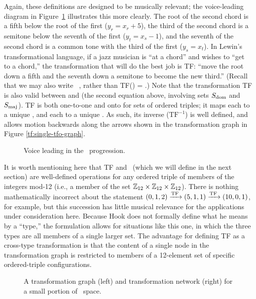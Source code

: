 \noindent Again, these definitions are designed to be musically relevant; the
voice-leading diagram in Figure~\ref{tf:tfo-voice-leading} illustrates this
more clearly. The root of the second chord is a fifth below the root
of the first ($y_r = x_r + 5$), the third of the second chord is a semitone
below the seventh of the first ($y_t = x_s - 1$), and the seventh of the
second chord is a common tone with the third of the first ($y_s = x_t$). In
Lewin's transformational language, if a jazz musician is ``at a \ii
chord'' and wishes to ``get to a \V chord,'' the transformation that
will do the best job is TF: ``move the root down a fifth and the seventh down
a semitone to become the new third.'' (Recall that we may also write
\mbox{\ii \TFarrow\ \V}, rather than TF(\ii) = \V.) Note
that the transformation TF is also valid between \V and \I
(the second equation above, involving sets $S_{\mathrm{dom}}$ and $S_{\mathrm{maj}}$). TF is
both one-to-one and onto for sets of ordered triples; it maps each \ii
to a unique \V, and each \V to a unique \I. As such, its
inverse ($\mathrm{TF}^{-1}$) is well defined, and allows motion backwards
along the arrows shown in the transformation graph in Figure
\ref{tf:single-tfo-graph}.

\begin{figure}[tbp]
  \caption{Voice leading in the \tfo\ progression.}
  \label{tf:tfo-voice-leading}
\end{figure}

It is worth mentioning here that TF and \tft\ (which we will define in the
next section) are well-defined operations for any ordered triple of members of
the integers mod-12 (i.e., a member of the set $\mathbb{Z}_{12} \times \mathbb{Z}_{12}
\times \mathbb{Z}_{12}$). There is nothing mathematically incorrect
about the statement $(0, 1, 2) \xrightarrow{\mathrm{TF}\,} (5, 1, 1) \xrightarrow{\mathrm{TF}\,} (10, 0, 1)$, for
example, but this succession has little musical relevance for the applications
under consideration here. Because Hook does not formally define what he means
by a ``type,'' the formulation allows for situations like this one, in which
the three types are all members of a single larger set. The advantage
for defining TF as a cross-type transformation is that the content of a single
node in the transformation graph is restricted to members of a 12-element set
of specific ordered-triple configurations.

\begin{figure}[tbp]
  \caption[A transformation graph and network for a small portion of \tf\
    space]{A transformation graph (left) and transformation network (right)
    for a small portion of \tf\ space.}
  \label{tf:trans-graph-large}
\end{figure}

